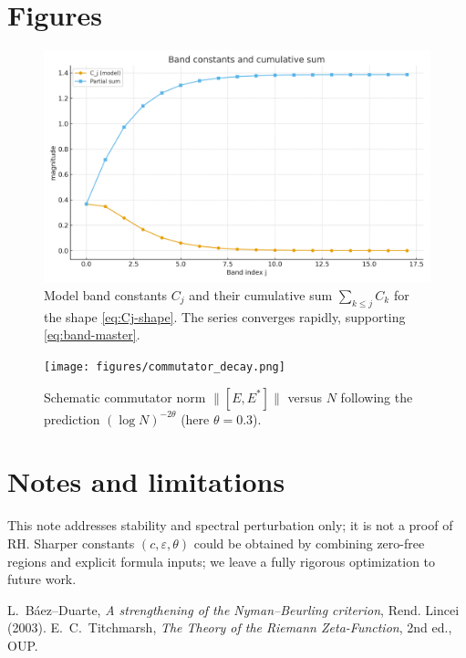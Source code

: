\documentclass[11pt]{article}
\theoremstyle{remark}
\begin{document}
\section{Figures}
\begin{figure}[h]
\centering
\includegraphics[width=.8\linewidth]{figures/band_constants_sum.png}
\caption{Model band constants $C_j$ and their cumulative sum $\sum_{k\le j}C_k$ for the shape \eqref{eq:Cj-shape}. The series converges rapidly, supporting \eqref{eq:band-master}.}
\label{fig:Cj}
\end{figure}

\begin{figure}[h]
\centering
\texttt{[image: figures/commutator\_decay.png]}
\caption{Schematic commutator norm $\lVert[E,E^\ast]\rVert$ versus $N$ following the prediction $(\log N)^{-2\theta}$ (here $\theta=0.3$).}
\label{fig:comm}
\end{figure}

\section{Notes and limitations}
This note addresses stability and spectral perturbation only; it is not a proof of RH.
Sharper constants $(c,\varepsilon,\theta)$ could be obtained by combining zero-free regions and explicit formula inputs; we leave a fully rigorous optimization to future work.

\begin{thebibliography}{9}
 L.~B\'aez--Duarte, \emph{A strengthening of the Nyman--Beurling criterion}, Rend. Lincei (2003).
 E.~C.~Titchmarsh, \emph{The Theory of the Riemann Zeta-Function}, 2nd ed., OUP.
\end{thebibliography}
\end{document}
